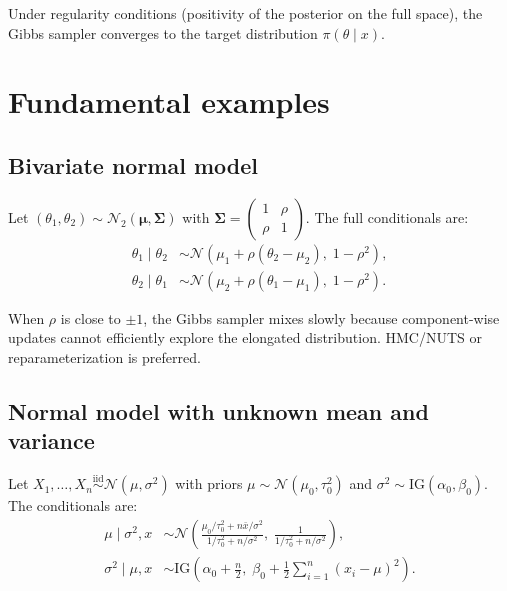 \begin{theorem}
Under regularity conditions (positivity of the posterior on the full
space), the Gibbs sampler converges to the target distribution
$\pi(\theta \mid x)$.
\end{theorem}

\section{Fundamental examples}

\subsection{Bivariate normal model}

\begin{example}
Let $(\theta_1, \theta_2) \sim \mathcal{N}_2(\boldsymbol{\mu}, \boldsymbol{\Sigma})$
with $\boldsymbol{\Sigma} = \begin{pmatrix} 1 & \rho \\ \rho & 1 \end{pmatrix}$.
The full conditionals are:
\begin{align*}
  \theta_1 \mid \theta_2 &\sim \mathcal{N}(\mu_1 + \rho(\theta_2 - \mu_2),\; 1 - \rho^2), \\
  \theta_2 \mid \theta_1 &\sim \mathcal{N}(\mu_2 + \rho(\theta_1 - \mu_1),\; 1 - \rho^2).
\end{align*}
\end{example}

\begin{warning}[title=\textbf{High correlation}]
When $\rho$ is close to $\pm 1$, the Gibbs sampler mixes slowly because
component-wise updates cannot efficiently explore the elongated
distribution. HMC/NUTS or reparameterization is preferred.
\end{warning}

\subsection{Normal model with unknown mean and variance}

\begin{example}
Let $X_1, \ldots, X_n \overset{\text{iid}}{\sim} \mathcal{N}(\mu, \sigma^2)$
with priors $\mu \sim \mathcal{N}(\mu_0, \tau_0^2)$ and
$\sigma^2 \sim \text{IG}(\alpha_0, \beta_0)$. The conditionals are:
\begin{align*}
  \mu \mid \sigma^2, x &\sim \mathcal{N}\!\left(
  \frac{\mu_0/\tau_0^2 + n\bar{x}/\sigma^2}{1/\tau_0^2 + n/\sigma^2},\;
  \frac{1}{1/\tau_0^2 + n/\sigma^2}\right), \\
  \sigma^2 \mid \mu, x &\sim \text{IG}\!\left(
  \alpha_0 + \frac{n}{2},\;
  \beta_0 + \frac{1}{2}\sum_{i=1}^n (x_i - \mu)^2\right).
\end{align*}
\end{example}

